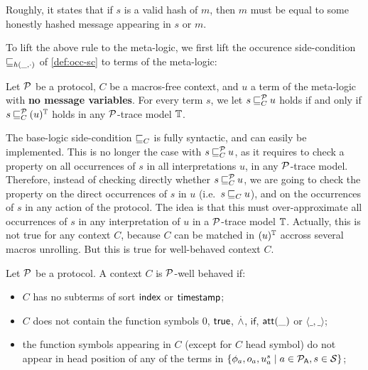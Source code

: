 Roughly, it states that if $s$ is a valid hash of $m$, then $m$ must be equal to some honestly hashed message appearing in $s$ or $m$.

To lift the above rule to the meta-logic, we first lift the occurence side-condition $\mathbin{\sqsubseteq}_{h(\_,\cdot)}$ of \cref{def:occ-sc} to terms of the meta-logic:

\begin{definition}
  \label{def:occ-sc-meta}
  Let $\mathcal{P}$ be a protocol, $C$ be a macros-free context, and $u$ a term of the meta-logic with \textbf{no message variables}. For every term $s$, we let $s \mathbin{\sqsubseteq}^{\mathcal{P}}_{C} u$ holds if and only if $s \mathbin{\sqsubseteq}^{\mathcal{P}}_{C} (u)^{\mathbb{T}}$ holds in any $\mathcal{P}$-trace model $\mathbb{T}$.
\end{definition}

The base-logic side-condition $\mathbin{\sqsubseteq}_{C}$ is fully syntactic, and can easily be implemented. This is no longer the case with $s \mathbin{\sqsubseteq}^{\mathcal{P}}_{C} u$, as it requires to check a property on all occurrences of $s$ in all interpretations $u$, in any $\mathcal{P}$-trace model. Therefore, instead of checking directly whether $s \mathbin{\sqsubseteq}^{\mathcal{P}}_{C} u$, we are going to check the property on the direct occurrences of $s$ in $u$ (i.e.\ $s \mathbin{\sqsubseteq}_{C} u$), and on the occurrences of $s$ in any action of the protocol. The idea is that this must over-approximate all occurrences of $s$ in any interpretation of $u$ in a $\mathcal{P}$-trace model $\mathbb{T}$. Actually, this is not true for any context $C$, because $C$ can be matched in $(u)^{\mathbb{T}}$ accross several macros unrolling. But this is true for well-behaved context $C$. 

\begin{definition}
  Let $\mathcal{P}$ be a protocol. A context $C$ is $\mathcal{P}$-well behaved if:
  \begin{itemize}
  \item $C$ has no subterms of sort $\textsf{index}$ or $\textsf{timestamp}$;
  \item $C$ does not contain the function symbols $0$, $\textsf{true}$, $\stackrel{.}{\wedge}$, $\mathsf{if}$, $\mathsf{att}(\_)$ or $\langle \_,\_\rangle$;
  \item the function symbols appearing in $C$ (except for $C$ head symbol) do not appear in head position of any of the terms in $\{\phi_a,o_a,u^s_a \mid a \in \mathcal{P}_{\textsf{A}}, s \in\mathcal{S}\}$;
  \end{itemize}
\end{definition}

